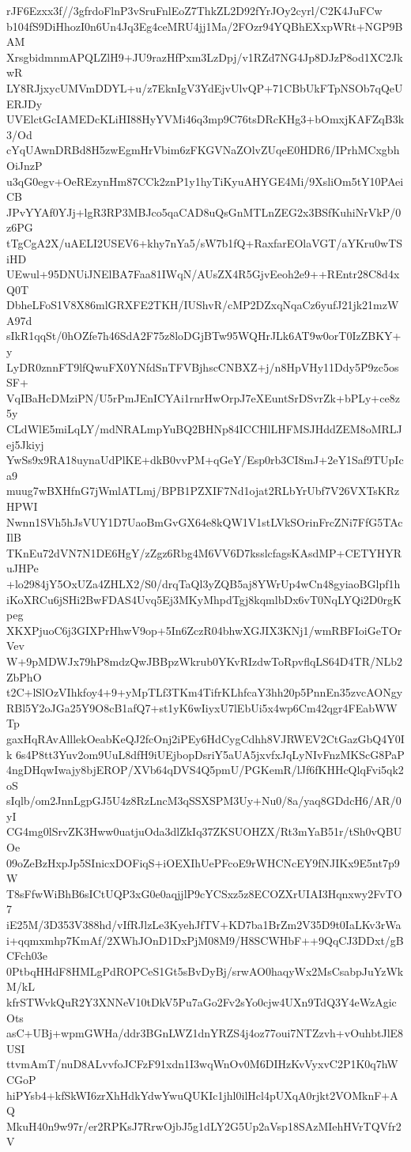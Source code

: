 rJF6Ezxx3f//3gfrdoFlnP3vSruFnlEoZ7ThkZL2D92fYrJOy2cyrl/C2K4JuFCw
b104fS9DiHhozI0n6Un4Jq3Eg4ceMRU4jj1Ma/2FOzr94YQBhEXxpWRt+NGP9BAM
XrsgbidmnmAPQLZlH9+JU9razHfPxm3LzDpj/v1RZd7NG4Jp8DJzP8od1XC2JkwR
LY8RJjxycUMVmDDYL+u/z7EknIgV3YdEjvUlvQP+71CBbUkFTpNSOb7qQeUERJDy
UVElctGcIAMEDcKLiHI88HyYVMi46q3mp9C76tsDRcKHg3+bOmxjKAFZqB3k3/Od
cYqUAwnDRBd8H5zwEgmHrVbim6zFKGVNaZOlvZUqeE0HDR6/IPrhMCxgbhOiJnzP
u3qG0egv+OeREzynHm87CCk2znP1y1hyTiKyuAHYGE4Mi/9XsliOm5tY10PAeiCB
JPvYYAf0YJj+lgR3RP3MBJco5qaCAD8uQsGnMTLnZEG2x3BSfKuhiNrVkP/0z6PG
tTgCgA2X/uAELI2USEV6+khy7nYa5/sW7b1fQ+RaxfarEOlaVGT/aYKru0wTSiHD
UEwul+95DNUiJNElBA7Faa81IWqN/AUsZX4R5GjvEeoh2e9++REntr28C8d4xQ0T
DbheLFoS1V8X86mlGRXFE2TKH/IUShvR/cMP2DZxqNqaCz6yufJ21jk21mzWA97d
sIkR1qqSt/0hOZfe7h46SdA2F75z8loDGjBTw95WQHrJLk6AT9w0orT0IzZBKY+y
LyDR0znnFT9lfQwuFX0YNfdSnTFVBjhscCNBXZ+j/n8HpVHy11Ddy5P9zc5osSF+
VqIBaHcDMziPN/U5rPmJEnICYAi1rnrHwOrpJ7eXEuntSrDSvrZk+bPLy+ce8z5y
CLdWlE5miLqLY/mdNRALmpYuBQ2BHNp84ICCHlLHFMSJHddZEM8oMRLJej5Jkiyj
YwSs9x9RA18uynaUdPlKE+dkB0vvPM+qGeY/Esp0rb3CI8mJ+2eY1Saf9TUpIca9
muug7wBXHfnG7jWmlATLmj/BPB1PZXIF7Nd1ojat2RLbYrUbf7V26VXTsKRzHPWI
Nwnn1SVh5hJsVUY1D7UaoBmGvGX64e8kQW1V1stLVkSOrinFrcZNi7FfG5TAcIlB
TKnEu72dVN7N1DE6HgY/zZgz6Rbg4M6VV6D7ksslcfagsKAsdMP+CETYHYRuJHPe
+lo2984jY5OxUZa4ZHLX2/S0/drqTaQl3yZQB5aj8YWrUp4wCn48gyiaoBGlpf1h
iKoXRCu6jSHi2BwFDAS4Uvq5Ej3MKyMhpdTgj8kqmlbDx6vT0NqLYQi2D0rgKpeg
XKXPjuoC6j3GIXPrHhwV9op+5In6ZczR04bhwXGJIX3KNj1/wmRBFIoiGeTOrVev
W+9pMDWJx79hP8mdzQwJBBpzWkrub0YKvRIzdwToRpvflqLS64D4TR/NLb2ZbPhO
t2C+lSlOzVIhkfoy4+9+yMpTLf3TKm4TifrKLhfcaY3hh20p5PnnEn35zvcAONgy
RBl5Y2oJGa25Y9O8cB1afQ7+st1yK6wIiyxU7lEbUi5x4wp6Cm42qgr4FEabWWTp
gaxHqRAvAlllekOeabKeQJ2fcOnj2iPEy6HdCygCdhh8VJRWEV2CtGazGbQ4Y0Ik
6s4P8tt3Yuv2om9UuL8dfH9iUEjbopDsriY5aUA5jxvfxJqLyNIvFnzMKScG8PaP
4ngDHqwIwajy8bjEROP/XVb64qDVS4Q5pmU/PGKemR/lJf6fKHHcQlqFvi5qk2oS
sIqlb/om2JnnLgpGJ5U4z8RzLncM3qSSXSPM3Uy+Nu0/8a/yaq8GDdcH6/AR/0yI
CG4mg0lSrvZK3Hww0uatjuOda3dlZkIq37ZKSUOHZX/Rt3mYaB51r/tSh0vQBUOe
09oZeBzHxpJp5SInicxDOFiqS+iOEXIhUePFcoE9rWHCNcEY9fNJIKx9E5nt7p9W
T8sFfwWiBhB6sICtUQP3xG0e0aqjjlP9cYCSxz5z8ECOZXrUIAI3Hqnxwy2FvTO7
iE25M/3D353V388hd/vIfRJlzLe3KyehJfTV+KD7ba1BrZm2V35D9t0IaLKv3rWa
i+qqmxmhp7KmAf/2XWhJOnD1DxPjM08M9/H8SCWHbF++9QqCJ3DDxt/gBCFch03e
0PtbqHHdF8HMLgPdROPCeS1Gt5sBvDyBj/srwAO0haqyWx2MsCsabpJuYzWkM/kL
kfrSTWvkQuR2Y3XNNeV10tDkV5Pu7aGo2Fv2sYo0cjw4UXn9TdQ3Y4eWzAgicOts
asC+UBj+wpmGWHa/ddr3BGnLWZ1dnYRZS4j4oz77oui7NTZzvh+vOuhbtJlE8USI
ttvmAmT/nuD8ALvvfoJCFzF91xdn1I3wqWnOv0M6DIHzKvVyxvC2P1K0q7hWCGoP
hiPYsb4+kfSkWI6zrXhHdkYdwYwuQUKIc1jhl0ilHcl4pUXqA0rjkt2VOMknF+AQ
MkuH40n9w97r/er2RPKsJ7RrwOjbJ5g1dLY2G5Up2aVsp18SAzMIehHVrTQVfr2V
